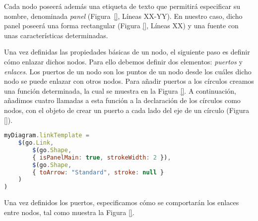 

Cada nodo poseerá además una etiqueta de texto que permitirá especificar su nombre, denominada \emph{panel} (Figura~\ref{}, Líneas XX-YY). En nuestro caso, dicho panel poseerá una forma rectangular (Figura \ref{}, Líneas XX) y una fuente con unas características determinadas. 

Una vez definidas las propiedades básicas de un nodo, el siguiente paso es definir cómo enlazar dichos nodos. Para ello debemos definir dos elementos: \emph{puertos} y \emph{enlaces}. Los puertos de un nodo son los puntos de un nodo desde los cuáles dicho nodo se puede enlazar con otros nodos. Para añadir puertos a los círculos creamos una función determinada, la cual se muestra en la Figura \ref{}. %
A continuación, añadimos cuatro llamadas a esta función a la declaración de los círculos como nodos, con el objeto de crear un puerto a cada lado del eje de un círculo (Figura \ref{}).




\begin{lstlisting}[language=JavaScript]
myDiagram.linkTemplate =
	$(go.Link, 
		$(go.Shape,  
		{ isPanelMain: true, strokeWidth: 2 }),
		$(go.Shape,  
		{ toArrow: "Standard", stroke: null }
	)
)
\end{lstlisting}


Una vez definidos los puertos, especificamos cómo se comportarán los enlaces entre nodos, tal como muestra la Figura \ref{}. %



